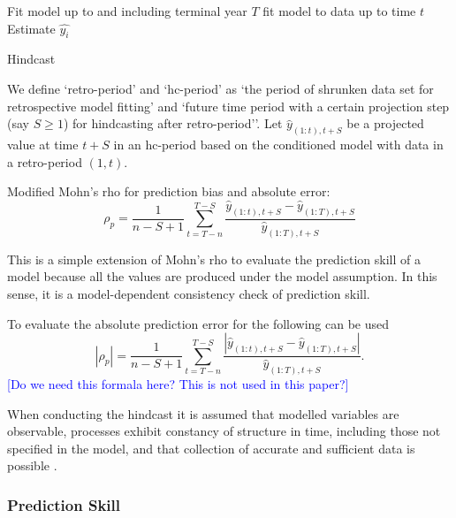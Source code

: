 \documentclass[12pt,halfline,a4paper,nonumbib]{ouparticle}
\newcommand{\toshi}{\textcolor{blue}}
\newcommand{\disp}{\displaystyle}
\begin{document}
\begin{algorithm}[!ht]
\begin{algorithmic}[1]
\State Fit model up to and including terminal year $T$
\State fit model to data up to time $t$  
\State Estimate $\hat{y_i}$
\EndFor
\EndFor
\caption{Hindcast}
\label{Hindcast}
\end{algorithmic}
\end{algorithm}


We  define `retro-period' and `hc-period' as `the period of shrunken data set for retrospective model fitting' and `future time period with a certain projection step (say $S \geq 1$) for hindcasting after retro-period''. Let $\hat{y}_{(1:t),t+S}$ be a projected value at time $t+S$ in an hc-period based on the conditioned model with data in a retro-period $(1,t)$. 

\vspace{0.2cm} \noindent
{ Modified Mohn's rho for prediction bias and absolute error:}\\
\begin{equation}
\label{eqn:mohn2}
\rho_p = \disp \frac{1}{n-S+1} \sum_{t=T-n}^{T-S} 
\frac{\hat{y}_{(1:t),t+S}-\hat{y}_{(1:T),t+S}}{\hat{y}_{(1:T),t+S}} 
\end{equation} 

This is a simple extension of Mohn's rho to evaluate the prediction skill of a model because all the values are produced under the model assumption. In this sense, it is a model-dependent consistency check of prediction skill. 

To evaluate the absolute prediction error for the following can be used
\begin{equation}
\label{eqn:mohn3}
|\rho_p| = \disp \frac{1}{n-S+1} \sum_{t=T-n}^{T-S}
\frac{\left| \hat{y}_{(1:t),t+S}-\hat{y}_{(1:T),t+S} \right|}{\hat{y}_{(1:T),t+S}}. 
\end{equation} 
\toshi{[Do we need this formala here? This is not used in this paper?]}


When conducting the hindcast it is assumed that modelled variables are observable, processes exhibit constancy of structure in time, including those not specified in the model, and that collection of accurate and sufficient data is possible \parencite{hodges1992you}.

\subsubsection{Prediction Skill}
\end{document}
